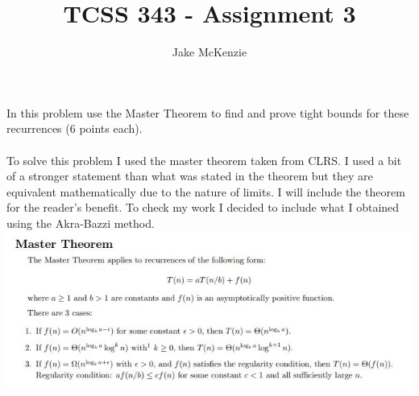 \documentclass[paper=a4,fontsize=11pt]{article}
\begin{document}
\title{TCSS 343 - Assignment 3}
\author{Jake McKenzie}
\maketitle
In this problem use the Master Theorem to find and prove tight bounds for these recurrences (6 points each).\\\\
To solve this problem I used the master theorem taken from CLRS. I used a bit of a stronger statement than what was stated in the theorem but they are equivalent mathematically due to the nature of limits. I will include the theorem for the reader's benefit. To check my work I decided to include what I obtained using the Akra-Bazzi method.\\
\includegraphics[width=\linewidth]{mastertheorem.JPG}
\end{document}
